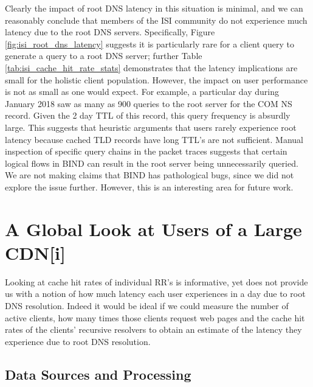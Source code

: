 \documentclass[sigconf,nonacm,10pt]{acmart}
\begin{document}
Clearly the impact of root DNS latency in this situation is minimal, and
we can reasonably conclude that members of the ISI community do not
experience much latency due to the root DNS servers. Specifically,
Figure \ref{fig:isi_root_dns_latency} suggests it is particularly rare
for a client query to generate a query to a root DNS server; further
Table \ref{tab:isi_cache_hit_rate_stats} demonstrates that the latency
implications are small for the holistic client population. However, the
impact on user performance is not as small as one would expect. For
example, a particular day during January 2018 saw as many as 900 queries
to the root server for the COM NS record. Given the 2 day TTL of this
record, this query frequency is absurdly large. This suggests that
heuristic arguments that users rarely experience root latency because
cached TLD records have long TTL's are not sufficient. Manual inspection
of specific query chains in the packet traces suggests that certain
logical flows in BIND can result in the root server being unnecessarily
queried. We are not making claims that BIND has pathological bugs, since
we did not explore the issue further. However, this is an interesting
area for future work.

\section{A Global Look at Users of a Large
CDN{[}i{]}}\label{a-global-look-at-users-of-a-large-cdni}

Looking at cache hit rates of individual RR's is informative, yet does
not provide us with a notion of how much latency each user experiences
in a day due to root DNS resolution. Indeed it would be ideal if we
could measure the number of active clients, how many times those clients
request web pages and the cache hit rates of the clients' recursive
resolvers to obtain an estimate of the latency they experience due to
root DNS resolution.

\subsection{Data Sources and
Processing}\label{data-sources-and-processing-1}
\end{document}
